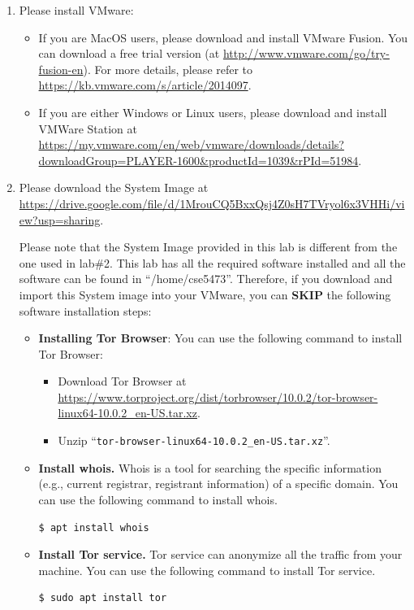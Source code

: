 \documentclass[11pt]{article}
\newcommand{\tor}{{\sf Tor}\xspace}
\newcommand{\torbw}{{\sf Tor Browser}\xspace}
\begin{document}
\begin{enumerate}
\item Please install VMware:
\begin{itemize}
    \item If you are MacOS users, please download and install VMware Fusion. You can  download a free trial version (at \url{http://www.vmware.com/go/try-fusion-en}). For more details, please refer to \url{https://kb.vmware.com/s/article/2014097}. 
    \item If you are either Windows or Linux users, please download and install VMWare Station at \url{https://my.vmware.com/en/web/vmware/downloads/details?downloadGroup=PLAYER-1600&productId=1039&rPId=51984}.  

\end{itemize}
\item Please download the System Image at \url{https://drive.google.com/file/d/1MrouCQ5BxxQsj4Z0sH7TVryol6x3VHHi/view?usp=sharing}.

Please note that the System Image provided in this lab is different from the one used in lab\#2. This lab has all the required software installed and all the software can be found in ``/home/cse5473''. Therefore, if you download and import this System image into your VMware, you can \textbf{SKIP} the following software installation steps:
\begin{itemize}
\item \textbf{Installing \torbw}: You can use the following command to install \torbw: 
\begin{itemize}
\item Download \torbw at \url{https://www.torproject.org/dist/torbrowser/10.0.2/tor-browser-linux64-10.0.2_en-US.tar.xz}.
\item Unzip ``\texttt{tor-browser-linux64-10.0.2\_en-US.tar.xz}''.
 
\end{itemize}

\item \textbf{Install \textsf{whois}.} Whois is a tool for searching the specific information (e.g., current registrar, registrant information) of a specific domain. You can use the following command to install \textsf{whois}. 

\begin{lstlisting}
$ apt install whois
\end{lstlisting}\vspace{-6mm}
 
 \item \textbf{Install \tor service.} \tor service can anonymize all the traffic from your machine. You can use the following command to install \tor service. 
 \begin{lstlisting}
$ sudo apt install tor
\end{lstlisting}\vspace{-6mm}


\end{itemize}
\end{enumerate}
\end{document}

